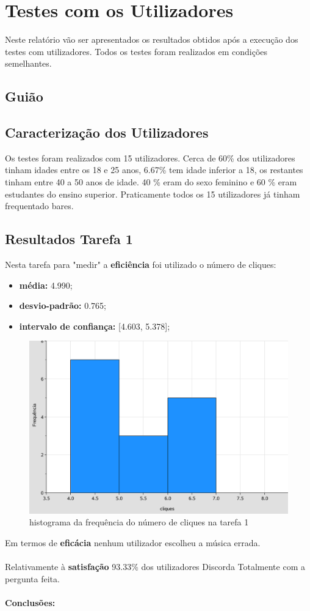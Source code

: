\documentclass{article}
\begin{document}
\section*{Testes com os Utilizadores}
Neste relatório vão ser apresentados os resultados obtidos após a execução dos testes com utilizadores. Todos os testes foram realizados em condições semelhantes.

\subsection*{Guião}

\subsection*{Caracterização dos Utilizadores}
Os testes foram realizados com 15 utilizadores.
Cerca de 60\% dos utilizadores tinham idades entre os 18 e 25 anos, 6.67\% tem idade inferior a 18, os restantes tinham entre 40 a 50 anos de idade. 40 \% eram do sexo feminino e 60 \% eram estudantes do ensino superior.
Praticamente todos os 15 utilizadores já tinham frequentado bares.

\subsection*{Resultados Tarefa 1}
Nesta tarefa para "medir" a \textbf{eficiência} foi utilizado o número de cliques:
\begin{itemize}
\item\textbf{média:} 4.990;
\item\textbf{desvio-padrão:} 0.765;
\item\textbf{intervalo de confiança:} [4.603, 5.378]; 
\end{itemize}
\begin{figure}[h]
\centering
\includegraphics[scale=0.35]{grafico1}
\caption{histograma da frequência do número de cliques na tarefa 1}
\end{figure} Em termos de \textbf{eficácia} nenhum utilizador escolheu a música errada.\\\\
Relativamente à \textbf{satisfação} 93.33\% dos utilizadores Discorda Totalmente com a pergunta feita.\\\\
\textbf{Conclusões:}
\end{document}
